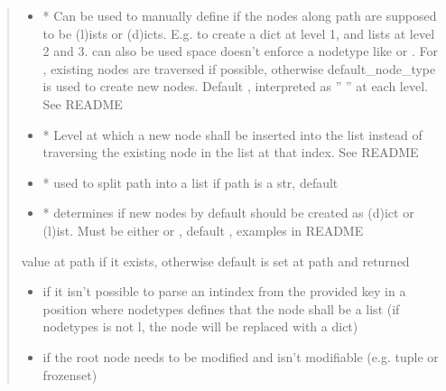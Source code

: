 \documentclass[a4paper,10pt,english]{sphinxmanual}
\begin{document}
\begin{fulllineitems}
\begin{fulllineitems}
\begin{quote}
\begin{description}
\begin{itemize}
\item {}
\sphinxAtStartPar
{} \textendash{} * Can be used to manually define if the nodes along path are supposed to be (l)ists or
(d)icts. E.g.  to create a dict at level 1, and lists at level 2 and 3.  can also be
used \textendash{} space doesn’t enforce a node\sphinxhyphen{}type like  or . For , existing nodes are
traversed if possible, otherwise default\_node\_type is used to create new nodes. Default ,
interpreted as ” ” at each level. See README

\item {}
\sphinxAtStartPar
{} \textendash{} * Level at which a new node shall be inserted into the list instead of traversing the
existing node in the list at that index. See README

\item {}
\sphinxAtStartPar
{} \textendash{} * used to split path into a list if path is a str, default 

\item {}
\sphinxAtStartPar
{} \textendash{} * determines if new nodes by default should be created as (d)ict or (l)ist. Must be
either  or , default , examples in README

\end{itemize}

\sphinxAtStartPar
value at path if it exists, otherwise default is set at path and returned

\begin{itemize}
\item {}
\sphinxAtStartPar
{} \textendash{} if it isn’t possible to parse an int\sphinxhyphen{}index from the provided key in a position where node\sphinxhyphen{}types
    defines that the node shall be a list (if node\sphinxhyphen{}types is not l, the node will be replaced with a dict)

\item {}
\sphinxAtStartPar
{} \textendash{} if the root node needs to be modified and isn’t modifiable (e.g. tuple or frozenset)


\end{itemize}
\end{description}
\end{quote}
\end{fulllineitems}
\end{fulllineitems}
\end{document}
